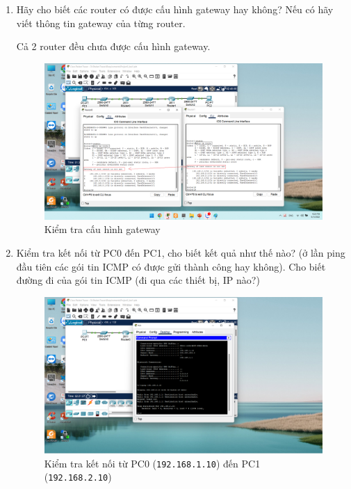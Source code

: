 \begin{enumerate}
\bf \item Hãy cho biết các router có được cấu hình gateway hay không? Nếu có hãy viết thông tin gateway của từng router.

\rm Cả 2 router đều chưa được cấu hình gateway.

\begin{figure}[H]
\begin{center}
\includegraphics[scale=0.4]{../figures/p1/p1-3}
\end{center}
\caption{Kiểm tra cấu hình gateway}
\end{figure}

\bf \item Kiểm tra kết nối từ PC0 đến PC1, cho biết kết quả như thế nào? (ở lần ping đầu tiên các gói tin ICMP có được gửi thành công hay không). Cho biết đường đi của gói tin ICMP (đi qua các thiết bị, IP nào?)

\rm 

\begin{figure}[H]
\begin{center}
\includegraphics[scale=0.4]{../figures/p1/p1-4}
\end{center}
\caption{Kiểm tra kết nối từ PC0 (\texttt{192.168.1.10}) đến PC1 (\texttt{192.168.2.10})}
\end{figure}


\end{enumerate}
